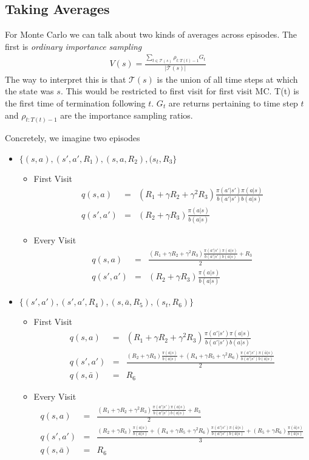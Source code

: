 \documentclass[11pt,a4paper]{article}
\newcommand\bea{\begin{eqnarray}}
\newcommand\eea{\end{eqnarray}}
\begin{document}
\subsection{Taking Averages}

For Monte Carlo we can talk about two kinds of averages across episodes. The first is {\em ordinary importance sampling} 
\bea
V(s) = \frac{\sum_{t \in \mathcal T(s)} \rho_{t:T(t)-1} G_t}{|\mathcal T(s)|}
\eea
The way to interpret this is that $\mathcal T(s)$ is the union of all time steps at which the state was $s$. This would be restricted to first visit for first visit MC. T(t) is the first time of termination following $t$. $G_t$ are returns pertaining to time step $t$ and $ \rho_{t:T(t)-1}$ are the importance sampling ratios.

Concretely, we imagine two episodes 
\begin{itemize}
\item $\{(s,a),(s',a',R_1),(s,a,R_2),(s_t,R_3\}$ 
\begin{itemize}
\item First Visit
\bea
q(s,a) &=& (R_1 + \gamma R_2+\gamma^2 R_3) \frac{\pi(a'|s') \pi(a|s)}{b(a'|s') b(a|s)} \\
q(s',a') &=& (R_2 + \gamma R_3) \frac{\pi(a|s)}{b(a|s)}
\eea
\item Every Visit
\bea
q(s,a) &=& \frac{(R_1 + \gamma R_2+\gamma^2 R_3) \frac{\pi(a'|s') \pi(a|s)}{b(a'|s') b(a|s)}+R_3}{2} \\
q(s',a') &=& (R_2 + \gamma R_3) \frac{\pi(a|s)}{b(a|s)}
\eea
\end{itemize}
\item  $\{(s',a'),(s',a',R_4),(s,\bar a,R_5),(s_t,R_6)\}$
\begin{itemize}
\item First Visit
\bea
q(s,a) &=& (R_1 + \gamma R_2+\gamma^2 R_3) \frac{\pi(a'|s') \pi(a|s)}{b(a'|s') b(a|s)} \\
q(s',a') &=& \frac{(R_2 + \gamma R_3) \frac{\pi(a|s)}{b(a|s)} + (R_4 + \gamma R_5 + \gamma^2 R_6) \frac{\pi(a'|s') \pi(\bar a|s)}{b(a'|s') b(\bar a|s)}}{2} \\
q(s,\bar a) &=& R_6
\eea
\item Every Visit
\bea
q(s,a) &=& \frac{(R_1 + \gamma R_2+\gamma^2 R_3) \frac{\pi(a'|s') \pi(a|s)}{b(a'|s') b(a|s)}+R_3}{2} \\
q(s',a') &=& \frac{(R_2 + \gamma R_3) \frac{\pi(a|s)}{b(a|s)} + (R_4 + \gamma R_5 + \gamma^2 R_6) \frac{\pi(a'|s') \pi(\bar a|s)}{b(a'|s') b(\bar a|s)} + (R_5+ \gamma R_6)  \frac{ \pi(\bar a|s)}{ b(\bar a|s)}}{3} \\
q(s,\bar a) &=& R_6
\eea
\end{itemize}
\end{itemize}
\end{document}
